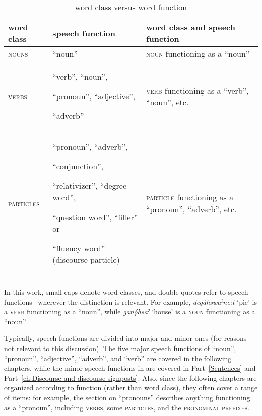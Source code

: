 \begin{table}
\caption{word class versus word function}
\label{tab:1:wdfun}
\begin{tabularx}{\textwidth}{lQQ}
\lsptoprule
word class & speech function & word class and speech function\\
\midrule
\textsc{nouns} & “noun” & \textsc{noun} functioning as a “noun”\\
\midrule 
\textsc{verbs} & “verb”, “noun”, 

“pronoun”, “adjective”, 

“adverb” & \textsc{verb} functioning as a “verb”, “noun”, etc.\\
\midrule 
\textsc{particles} & “pronoun”, “adverb”, 

“conjunction”, 

“relativizer”, “degree word”, 

“question word”, “filler” or 

“fluency word” (discourse particle) & \textsc{particle} functioning as a “pronoun”, “adverb”, etc.\\
\lspbottomrule
\end{tabularx}
\end{table}


In this work, small caps denote word classes, and double quotes refer to speech functions --wherever the distinction is relevant. For example, \textit{degáhswa̱ˀne:t} ‘pie’ is a \textsc{verb} functioning as a “noun”, while \textit{ganǫ́hsaˀ} ‘house’ is a \textsc{noun} functioning as a “noun”.

Typically, speech functions are divided into major and minor ones (for reasons not relevant to this discussion). The five major speech functions of “noun”, “pronoun”, “adjective”, “adverb”, and “verb” are covered in the following chapters, while the minor speech functions in  are covered in Part~\ref{Sentences} and Part~\ref{ch:Discourse and discourse signposts}. Also, since the following chapters are organized according to function (rather than word class), they often cover a range of items: for example, the section on “pronouns” describes anything functioning as a “pronoun”, including \textsc{verbs}, some \textsc{particles}, and the \textsc{pronominal prefixes}.

